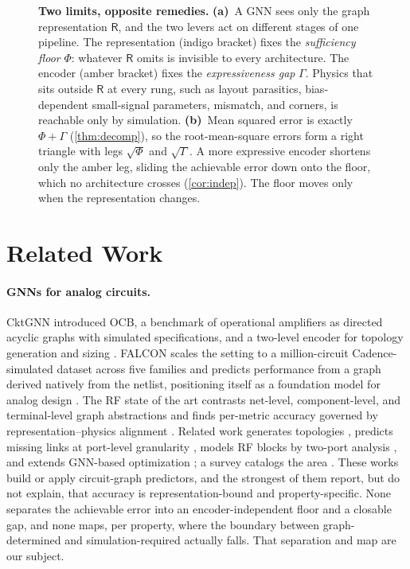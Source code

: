 \documentclass[10pt]{article}
\newcommand{\R}{\mathsf{R}}
\newcommand{\panellab}[1]{{\sffamily\bfseries #1}}
\begin{document}
\begin{figure}[t]
{\begin{tikzpicture}[font=\sffamily, line cap=round, line join=round]
\end{tikzpicture}%
}
\caption{\textbf{Two limits, opposite remedies.}
\panellab{(a)}~A GNN sees only the graph representation $\R$, and the two levers act on
different stages of one pipeline. The representation (indigo bracket) fixes the
\emph{sufficiency floor} $\Phi$: whatever $\R$ omits is invisible to every architecture.
The encoder (amber bracket) fixes the \emph{expressiveness gap} $\Gamma$. Physics that
sits outside $\R$ at every rung, such as layout parasitics, bias-dependent small-signal
parameters, mismatch, and corners, is reachable only by simulation.
\panellab{(b)}~Mean squared error is exactly $\Phi+\Gamma$ (\cref{thm:decomp}), so the
root-mean-square errors form a right triangle with legs $\sqrt{\Phi}$ and $\sqrt{\Gamma}$.
A more expressive encoder shortens only the amber leg, sliding the achievable error down
onto the floor, which no architecture crosses (\cref{cor:indep}). The floor moves only
when the representation changes.}
\label{fig:teaser}
\end{figure}

\section{Related Work}

\paragraph{GNNs for analog circuits.}
CktGNN introduced OCB, a benchmark of operational amplifiers as directed acyclic graphs with simulated specifications, and a two-level encoder for topology generation and sizing \citep{dong2023cktgnn}. FALCON scales the setting to a million-circuit Cadence-simulated dataset across five families and predicts performance from a graph derived natively from the netlist, positioning itself as a foundation model for analog design \citep{mehradfar2025falcon}. The RF state of the art contrasts net-level, component-level, and terminal-level graph abstractions and finds per-metric accuracy governed by representation--physics alignment \citep{asadi2025rfinformed}. Related work generates topologies \citep{gao2025analoggenie,chang2024lamagic}, predicts missing links at port-level granularity \citep{pan2025gnnaclp}, models RF blocks by two-port analysis \citep{fayazi2023funtom}, and extends GNN-based optimization \citep{graphofcircuits2023}; a survey catalogs the area \citep{sanchez2023survey}. These works build or apply circuit-graph predictors, and the strongest of them report, but do not explain, that accuracy is representation-bound and property-specific. None separates the achievable error into an encoder-independent floor and a closable gap, and none maps, per property, where the boundary between graph-determined and simulation-required actually falls. That separation and map are our subject.
\end{document}
